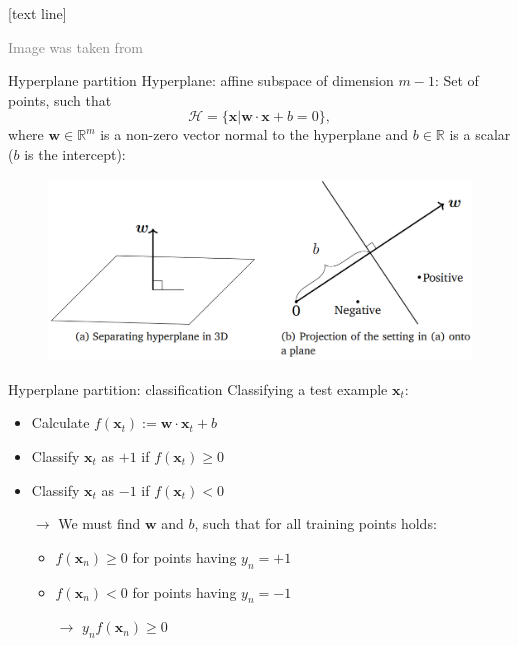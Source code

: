 \documentclass[dvipsnames]{beamer}
\newcommand{\referencefootnote}[1]{\setbeamertemplate{footline}[text line]{%
\parbox{0.9\paperwidth}{\vspace*{-23pt}\tiny{\textcolor{gray}{#1}}\hfill\scriptsize\insertframenumber}}}
\begin{document}
		{ \referencefootnote{Image was taken from \cite{deisenroth_faisal_ong_2020}}
		\begin{frame}{Hyperplane partition}
			Hyperplane: affine subspace of dimension $m-1$: Set of points, such that
			\[
				\mathcal{H} = \{\mathbf{x}|\mathbf{w}\cdot \mathbf{x} + b = 0\},
			\]
			where $\mathbf{w} \in \mathbb{R}^m$ is a non-zero vector normal to the hyperplane and $b\in \mathbb{R}$ is a scalar ($b$ is the intercept):
			 \begin{figure}
					\center
					\includegraphics[scale=.3]{figures/hyperplane.png}
        \end{figure}

    \end{frame}
		}
		
		\begin{frame}{Hyperplane partition: classification}
				Classifying a test example $\mathbf{x}_t$:
				\begin{itemize}
					\item Calculate $f(\mathbf{x}_t):= \mathbf{w}\cdot \mathbf{x}_t + b$ \pause
					\item Classify $\mathbf{x}_t$ as $+1$ if $f(\mathbf{x}_t)\geq 0$ \pause
					\item Classify $\mathbf{x}_t$ as $-1$ if $f(\mathbf{x}_t)< 0$ \pause
				\end{itemize}
				\begin{itemize}
					\item[$\rightarrow$] We must find $\mathbf{w}$ and $b$, such that for all training points holds:
					\begin{itemize}
						\item $f(\mathbf{x}_n)\geq0$ for points having $y_n = +1$
						\item $f(\mathbf{x}_n)<0$ for points having $y_n = -1$
						\item[$\rightarrow$] $y_{n} f(\mathbf{x}_n)\geq0$
					\end{itemize}
				\end{itemize}
			\end{frame}
		
\end{document}
